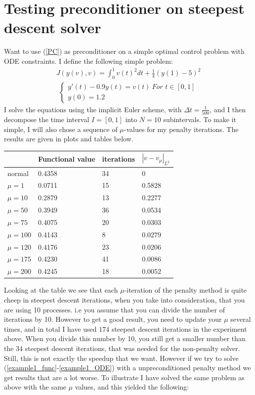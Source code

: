 \documentclass[11pt,a4paper]{article}
\begin{document}
\section{Testing preconditioner on steepest descent solver}
Want to use (\ref{PC}) as preconditioner on a simple optimal control problem with ODE constraints. I define the following simple problem:
\begin{align}
J(y(v),v)=\int_0^1 v(t)^2 dt + \frac{1}{4}(y(1)-5)^2  \label{example1_func}
\end{align} 
\begin{align}
\left\{
     \begin{array}{lr}
		y'(t) - 0.9y(t) = v(t) \ 	\textit{For $t \in [0,1]$} \\
		y(0)=1.2
	\end{array}
   \right. \label{example1_ODE}
\end{align}
I solve the equations using the implicit Euler scheme, with $\Delta t=\frac{1}{500}$, and I then decompose the time interval $I=[0,1]$ into $N=10$ subintervals. To make it simple, I will also chose a sequence of $\mu$-values for my penalty iterations. The results are given in plots and tables below. 
 \begin{center}
    \begin{tabular}{| l | l | l | l |}
    \hline
     & Functional value &iterations  & $|v-v_{\mu}|_{L^2}$   \\ \hline
    normal &0.4358 & 34& 0 	\\ \hline
    $\mu=1$ & 0.0711& 15&0.5828 	\\ \hline
    $\mu=10$ &0.2879 &13& 0.2277	\\ \hline
    $\mu=50$ &0.3949&36& 0.0534	\\ \hline
    $\mu=75$ &0.4075&20&0.0303\\ \hline
    $\mu=100$ &0.4143&8&	0.0279\\ \hline
    $\mu=120$ &0.4176&23&0.0206\\ \hline
    $\mu=175$ &0.4230&41&0.0086\\ \hline
    $\mu=200$ &0.4245&18&0.0052\\ \hline
    \end{tabular}
\end{center}
Looking at the table we see that each $\mu$-iteration of the penalty method is quite cheep in steepest descent iterations, when you take into consideration, that you are using 10 processes. i.e you assume that you can divide the number of iterations by 10. However to get a good result, you need to update your $\mu$ several times, and in total I have used $174$ steepest descent iterations in the experiment above. When you divide this number by 10, you still get a smaller number than the 34 steepest descent iterations, that was needed for the non-penalty solver. Still, this is not exactly the speedup that we want. However if we try to solve (\ref{example1_func}-\ref{example1_ODE}) with a unpreconditioned penalty method we get results that are a lot worse. To illustrate I have solved the same problem as above with the same $\mu$ values, and this yielded the following:
\end{document}
